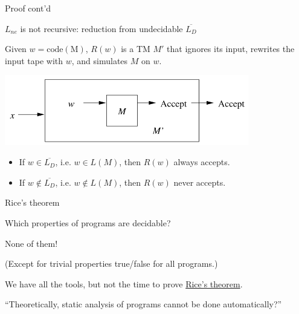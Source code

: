 \documentclass[handout]{beamer}
\begin{document}
\begin{frame}{Proof cont'd}

    \alert{$L_{ne}$ is not recursive:} reduction from undecidable $\overline{L_D}$

    Given $w=\mathrm{code(M)}$, $R(w)$ is a TM $M'$ that ignores its input, rewrites the input tape with $w$, and simulates $M$ on $w$. 

    \begin{center}
        \includegraphics[width=0.8\textwidth]{files/Lne2.PNG}
    \end{center}
    
    \begin{itemize}
        \item If $w\in\overline{L_D}$, i.e. $w\in L(M)$, then $R(w)$ always accepts.
        \item If $w\notin\overline{L_D}$, i.e. $w\notin L(M)$, then $R(w)$ never accepts.\hfill\qedsymbol
    \end{itemize}

\end{frame}


\begin{frame}{Rice's theorem}

    Which properties of programs are decidable?

    \bigskip

    None of them!

    \bigskip

    (Except for trivial properties true/false for all programs.)

    \bigskip

    We have all the tools, but not the time to prove \href{https://en.wikipedia.org/wiki/Rice\%27s\_theorem}{\alert{Rice's theorem}}.

    \bigskip

    ``Theoretically, static analysis of programs cannot be done automatically?''

\end{frame}
\end{document}
